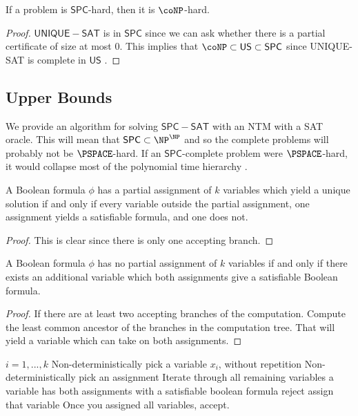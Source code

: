 \documentclass[runningheads,a4paper]{llncs}
\begin{document}
\begin{proposition}
If a problem is $\mathsf{SPC}$-hard, then it is $\coNP$-hard. 
\end{proposition}

\begin{proof}
$\mathsf{UNIQUE-SAT}$ is in $\mathsf{SPC}$ since we can ask whether there is a partial certificate of size at most $0$. This implies that $\coNP \subset \mathsf{US} \subset \mathsf{SPC}$ since UNIQUE-SAT is complete in $\mathsf{US}$ \cite{blass1982unique}.
\end{proof}

\subsection{Upper Bounds}

We provide an algorithm for solving $\mathsf{SPC-SAT}$ with an NTM with a SAT oracle. This will mean that $\mathsf{SPC} \subset \NP^{\NP}$ and so the complete problems will probably not be $\PSPACE$-hard. If an $\mathsf{SPC}$-complete problem were $\PSPACE$-hard, it would collapse most of the polynomial time hierarchy \cite{stockmeyer1976polynomial}. 

\begin{lemma}
A Boolean formula $\phi$ has a partial assignment of $k$ variables which yield a unique solution if and only if every variable outside the partial assignment, one assignment yields a satisfiable formula, and one does not.
\end{lemma}

\begin{proof}
This is clear since there is only one accepting branch.
\end{proof}

\begin{lemma}
A Boolean formula $\phi$ has no partial assignment of $k$ variables if and only if there exists an additional variable which both assignments give a satisfiable Boolean formula.
\end{lemma}

\begin{proof}
If there are at least two accepting branches of the computation. Compute the least common ancestor of the branches in the computation tree. That will yield a variable which can take on both assignments. 
\end{proof}

\begin{codebox}
\li \For $i = 1, ..., k$ \Then
\li Non-deterministically pick a variable $x_i$, without repetition
\li Non-deterministically pick an assignment \End
\li Iterate through all remaining variables \Then
\li \If a variable has both assignments with a satisfiable boolean formula \Then
\li reject
\li \Else assign that variable \End \End
\li Once you assigned all variables, accept.
\end{codebox}
\end{document}
